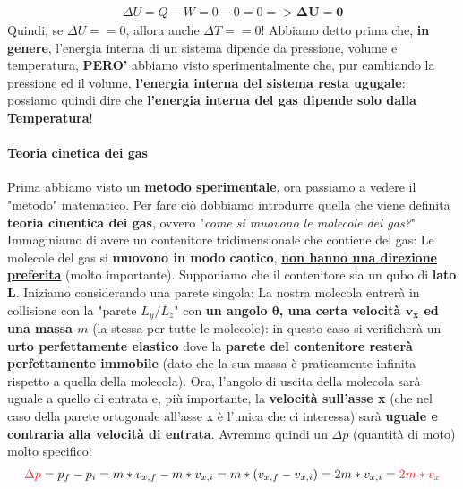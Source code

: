                     \begin{align*}
                        \Delta U = Q-W = 0-0 = 0 => \mathbf{\Delta U = 0}
                    \end{align*}
                    Quindi, se $\Delta U == 0$, allora anche $\Delta T == 0$!
                    Abbiamo detto prima che, \textbf{in genere}, l'energia interna di un sistema dipende da pressione, volume e temperatura, \textbf{PERO'} abbiamo visto sperimentalmente che, pur cambiando la pressione ed il volume, \textbf{l'energia interna del sistema resta ugugale}: possiamo quindi dire che \textbf{l'energia interna del gas dipende solo dalla Temperatura}!


                \paragraph{Teoria cinetica dei gas}
                    Prima abbiamo visto un \textbf{metodo sperimentale}, ora passiamo a vedere il "metodo" matematico. Per fare ciò dobbiamo introdurre quella che viene definita \textbf{teoria cinentica dei gas}, ovvero "\textit{come si muovono le molecole dei gas?}" Immaginiamo di avere un contenitore tridimensionale che contiene del gas:
                    Le molecole del gas si \textbf{muovono in modo caotico}, \textbf{\underline{non hanno una direzione preferita}} (molto importante). Supponiamo che il contenitore sia un qubo di \textbf{lato $\mathbf{L}$}. Iniziamo considerando una parete singola:
                    La nostra molecola entrerà in collisione con la "parete $L_y/L_z$" con \textbf{un angolo $\mathbf{\theta}$, una certa velocità $\mathbf{v_x}$ ed una massa $m$} (la stessa per tutte le molecole): in questo caso si verificherà un \textbf{urto perfettamente elastico} dove la \textbf{parete del contenitore resterà perfettamente immobile} (dato che la sua massa è praticamente infinita rispetto a quella della molecola). Ora, l'angolo di uscita della molecola sarà uguale a quello di entrata e, più importante, la \textbf{velocità sull'asse x} (che nel caso della parete ortogonale all'asse x è l'unica che ci interessa) sarà \textbf{uguale e contraria alla velocità di entrata}. Avremmo quindi un $\Delta p$ (quantità di moto) molto specifico:
                    \begin{align*}
                        \textcolor{Red}{\Delta p} = p_f-p_i = m*v_{x, f}-m*v_{x, i}=m*(v_{x, f}-v_{x, i}) =2m*v_{x, i}= \textcolor{Red}{2m*v_{x}}
                    \end{align*}

